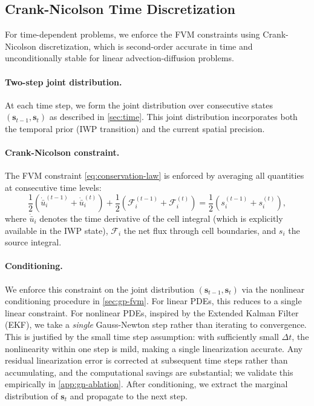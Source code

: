 \documentclass{article}
\theoremstyle{plain}
\theoremstyle{definition}
\theoremstyle{remark}
\begin{document}
\subsection{Crank-Nicolson Time Discretization}
\label{app:crank-nicolson}

For time-dependent problems, we enforce the FVM constraints using Crank-Nicolson discretization, which is second-order accurate in time and unconditionally stable for linear advection-diffusion problems.

\paragraph{Two-step joint distribution.}
At each time step, we form the joint distribution over consecutive states $(\bm{s}_{t-1}, \bm{s}_t)$ as described in \cref{sec:time}.
This joint distribution incorporates both the temporal prior (IWP transition) and the current spatial precision.

\paragraph{Crank-Nicolson constraint.}
The FVM constraint \cref{eq:conservation-law} is enforced by averaging all quantities at consecutive time levels:
\begin{equation}\label{eq:cn_averaged}
  \frac{1}{2}\left( \dot{\bar{u}}_i^{(t-1)} + \dot{\bar{u}}_i^{(t)} \right) + \frac{1}{2}\left( \mathcal{F}_i^{(t-1)} + \mathcal{F}_i^{(t)} \right) = \frac{1}{2}\left( s_i^{(t-1)} + s_i^{(t)} \right),
\end{equation}
where $\dot{\bar{u}}_i$ denotes the time derivative of the cell integral (which is explicitly available in the IWP state), $\mathcal{F}_i$ the net flux through cell boundaries, and $s_i$ the source integral.

\paragraph{Conditioning.}
We enforce this constraint on the joint distribution $(\bm{s}_{t-1}, \bm{s}_t)$ via the nonlinear conditioning procedure in \cref{sec:gp-fvm}.
For linear PDEs, this reduces to a single linear constraint.
For nonlinear PDEs, inspired by the Extended Kalman Filter (EKF), we take a \emph{single} Gauss-Newton step rather than iterating to convergence.
This is justified by the small time step assumption: with sufficiently small $\Delta t$, the nonlinearity within one step is mild, making a single linearization accurate.
Any residual linearization error is corrected at subsequent time steps rather than accumulating, and the computational savings are substantial; we validate this empirically in \cref{app:gn-ablation}.
After conditioning, we extract the marginal distribution of $\bm{s}_t$ and propagate to the next step.
\end{document}
